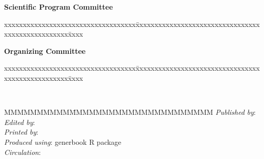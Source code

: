\DocCenterPageTwo

\DocBottomPageTwo

\newpage



\thispagestyle{empty}

{\bf Scientific Program Committee}\\%
\begin{tabbing}
xxxxxxxxxxxxxxxxxxxxxxxxxxxxxxxxxxx\=xxxxxxxxxxxxxxxxxxxxxxxxxxxxxxxxxxxxxxxxxxxxxxxxxx\=xxxx \kill

\DocScientificComm
\end{tabbing}

\vspace{2cm}

{\bf Organizing Committee}\\%
\begin{tabbing}
xxxxxxxxxxxxxxxxxxxxxxxxxxxxxxxxxxx\=xxxxxxxxxxxxxxxxxxxxxxxxxxxxxxxxxxxxxxxxxxxxxxxxxx\=xxxx \kill
\DocOrganizingComm
\end{tabbing}

\noindent  \hrulefill \\

\vspace{1cm}

 {
 \begin{tabbing}
 MMMMMMMMMM\=MMMMMMMMMMMMMMMMMMMMMM \kill
 {\em Published by}: \> \DocPublisher \\ %
 {\em Edited by}: \> \DocEditors \\ %
 {\em Printed by}: \> \DocPrinter \\
 {\em Produced using}: \> generbook R package\\
 {\em Circulation}: \> \DocCirculation \\
 \end{tabbing}
 }

\clearpage


